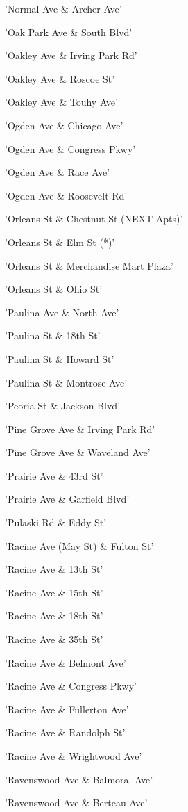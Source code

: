 \documentclass[11pt]{article}
\begin{document}
\begin{enumerate*}
\item 'Normal Ave \& Archer Ave'
\item 'Oak Park Ave \& South Blvd'
\item 'Oakley Ave \& Irving Park Rd'
\item 'Oakley Ave \& Roscoe St'
\item 'Oakley Ave \& Touhy Ave'
\item 'Ogden Ave \& Chicago Ave'
\item 'Ogden Ave \& Congress Pkwy'
\item 'Ogden Ave \& Race Ave'
\item 'Ogden Ave \& Roosevelt Rd'
\item 'Orleans St \& Chestnut St (NEXT Apts)'
\item 'Orleans St \& Elm St (*)'
\item 'Orleans St \& Merchandise Mart Plaza'
\item 'Orleans St \& Ohio St'
\item 'Paulina Ave \& North Ave'
\item 'Paulina St \& 18th St'
\item 'Paulina St \& Howard St'
\item 'Paulina St \& Montrose Ave'
\item 'Peoria St \& Jackson Blvd'
\item 'Pine Grove Ave \& Irving Park Rd'
\item 'Pine Grove Ave \& Waveland Ave'
\item 'Prairie Ave \& 43rd St'
\item 'Prairie Ave \& Garfield Blvd'
\item 'Pulaski Rd \& Eddy St'
\item 'Racine Ave (May St) \& Fulton St'
\item 'Racine Ave \& 13th St'
\item 'Racine Ave \& 15th St'
\item 'Racine Ave \& 18th St'
\item 'Racine Ave \& 35th St'
\item 'Racine Ave \& Belmont Ave'
\item 'Racine Ave \& Congress Pkwy'
\item 'Racine Ave \& Fullerton Ave'
\item 'Racine Ave \& Randolph St'
\item 'Racine Ave \& Wrightwood Ave'
\item 'Ravenswood Ave \& Balmoral Ave'
\item 'Ravenswood Ave \& Berteau Ave'

\end{enumerate*}
\end{document}
